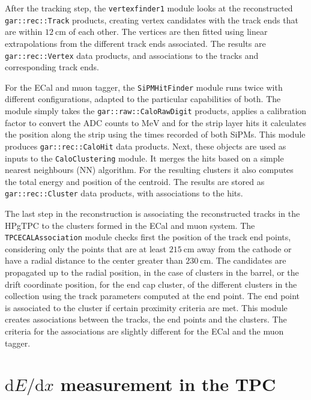 After the tracking step, the \texttt{vertexfinder1} module looks at the reconstructed \texttt{gar::rec::Track} products, creating vertex candidates with the track ends that are within $12~\mathrm{cm}$ of each other. The vertices are then fitted using linear extrapolations from the different track ends associated. The results are \texttt{gar::rec::Vertex} data products, and associations to the tracks and corresponding track ends.

For the ECal and muon tagger, the \texttt{SiPMHitFinder} module runs twice with different configurations, adapted to the particular capabilities of both. The module simply takes the \texttt{gar::raw::CaloRawDigit} products, applies a calibration factor to convert the ADC counts to $\mathrm{MeV}$ and for the strip layer hits it calculates the position along the strip using the times recorded of both SiPMs. This module produces \texttt{gar::rec::CaloHit} data products. Next, these objects are used as inputs to the \texttt{CaloClustering} module. It merges the hits based on a simple nearest neighbours (NN) algorithm. For the resulting clusters it also computes the total energy and position of the centroid. The results are stored as \texttt{gar::rec::Cluster} data products, with associations to the hits.

The last step in the reconstruction is associating the reconstructed tracks in the HPgTPC to the clusters formed in the ECal and muon system. The \texttt{TPCECALAssociation} module checks first the position of the track end points, considering only the points that are at least $215~\mathrm{cm}$ away from the cathode or have a radial distance to the center greater than $230~\mathrm{cm}$. The candidates are propagated up to the radial position, in the case of clusters in the barrel, or the drift coordinate position, for the end cap cluster, of the different clusters in the collection using the track parameters computed at the end point. The end point is associated to the cluster if certain proximity criteria are met. This module creates associations between the tracks, the end points and the clusters. The criteria for the associations are slightly different for the ECal and the muon tagger.

\section[\texorpdfstring{$\mathrm{d}E/\mathrm{d}x$}{dE/dx} measurement in the TPC]{\boldmath\texorpdfstring{$\mathrm{d}E/\mathrm{d}x$}{dE/dx} measurement in the TPC}

